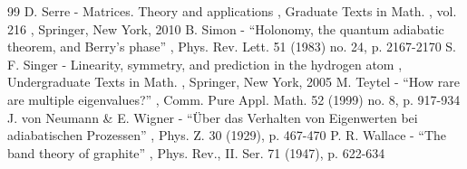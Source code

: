 \documentclass[11pt]{article}
\numberwithin{equation}{section}
\begin{document}
\begin{thebibliography}{99}
 D. Serre - Matrices. Theory and applications , Graduate Texts in Math. , vol. 216 , Springer, New York, 2010
 B. Simon - “Holonomy, the quantum adiabatic theorem, and Berry’s phase” , Phys. Rev. Lett. 51 (1983) no. 24, p. 2167-2170
 S. F. Singer - Linearity, symmetry, and prediction in the hydrogen atom , Undergraduate Texts in Math. , Springer, New York, 2005
 M. Teytel - “How rare are multiple eigenvalues?” , Comm. Pure Appl. Math. 52 (1999) no. 8, p. 917-934
 J. von Neumann \& E. Wigner - “Über das Verhalten von Eigenwerten bei adiabatischen Prozessen” , Phys. Z. 30 (1929), p. 467-470
 P. R. Wallace - “The band theory of graphite” , Phys. Rev., II. Ser. 71 (1947), p. 622-634
\end{thebibliography}
\end{document}
